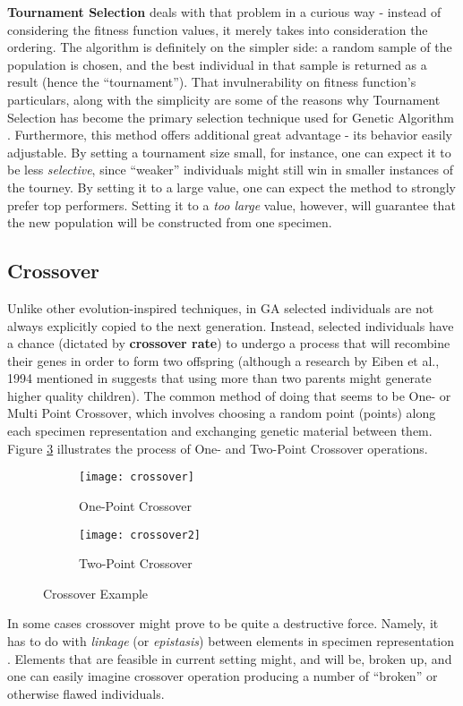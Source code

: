 \textbf{Tournament Selection} deals with that problem in a curious way - instead of considering the fitness function values, it merely takes into consideration the ordering. The algorithm is definitely on the simpler side: a random sample of the population is chosen, and the best individual in that sample is returned as a result (hence the ``tournament''). That invulnerability on fitness function's particulars, along with the simplicity are some of the reasons why Tournament Selection has become the primary selection technique used for Genetic Algorithm \cite{Luke2013Metaheuristics}. Furthermore, this method offers additional great advantage - its behavior easily adjustable. By setting a tournament size small, for instance, one can expect it to be less \textit{selective}, since ``weaker'' individuals might still win in smaller instances of the tourney. By setting it to a large value, one can expect the method to strongly prefer top performers. Setting it to a \textit{too large} value, however, will guarantee that the new population will be constructed from one specimen.

\subsection{Crossover}
Unlike other evolution-inspired techniques, in GA selected individuals are not always explicitly copied to the next generation. Instead, selected individuals have a chance (dictated by \textbf{crossover rate}) to undergo a process that will recombine their genes in order to form two offspring (although a research by Eiben et al., 1994 mentioned in \cite{ksheperthesis} suggests that using more than two parents might generate higher quality children). The common method of doing that seems to be One- or Multi Point Crossover, which involves choosing a random point (points) along each specimen representation and exchanging genetic material between them. Figure \ref{fig:x crossoverexample} illustrates the process of One- and Two-Point Crossover operations.
\begin{figure}[h]
    \centering
    \begin{subfigure}[b]{0.5\textwidth}
        \centering
        \texttt{[image: crossover]}
        \caption{One-Point Crossover}
        \label{fig:onepointcrossover}
    \end{subfigure}
    \hfill
    \begin{subfigure}[b]{0.5\textwidth}
        \centering
        \texttt{[image: crossover2]}
        \caption{Two-Point Crossover}
        \label{fig:twopointcrossover}
    \end{subfigure}
    \caption{Crossover Example}
    \label{fig:x crossoverexample}
\end{figure}
In some cases crossover might prove to be quite a destructive force. Namely, it has to do with \textit{linkage} (or \textit{epistasis}) between elements in specimen representation \cite{Luke2013Metaheuristics}. Elements that are feasible in current setting might, and will be, broken up, and one can easily imagine crossover operation producing a number of ``broken'' or otherwise flawed individuals.

